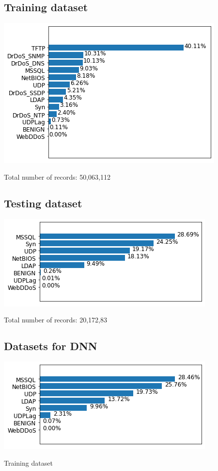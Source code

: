 \documentclass[11pt]{article}
\begin{document}
\subsection*{Training dataset}
\label{sec:orga5a844a}
\begin{center}
\includegraphics[width=.9\linewidth]{./img/train_ds.png}
\end{center}

Total number of records: 50,063,112
\subsection*{Testing dataset}
\label{sec:org6e00cf0}
\begin{center}
\includegraphics[width=.9\linewidth]{./img/test_ds.png}
\end{center}

Total number of records: 20,172,83
\subsection*{Datasets for DNN}
\label{sec:org61d4a34}
\begin{center}
\includegraphics[width=.9\linewidth]{./img/train2_ds.png}
\end{center}
Training dataset
\end{document}

